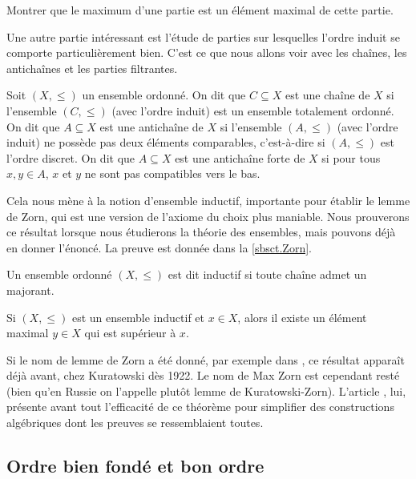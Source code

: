 \begin{exercise}
  Montrer que le maximum d'une partie est un élément maximal de cette partie.
\end{exercise}

Une autre partie intéressant est l'étude de parties sur lesquelles l'ordre
induit se comporte particulièrement bien. C'est ce que nous allons voir avec les
chaînes, les antichaînes et les parties filtrantes.

\begin{definition}
  Soit $(X,\leq)$ un ensemble ordonné. On dit que $C\subseteq X$ est une chaîne
  de $X$ si l'ensemble $(C,\leq)$ (avec l'ordre induit) est un ensemble
  totalement ordonné. On dit que $A\subseteq X$ est une antichaîne de $X$ si
  l'ensemble $(A,\leq)$ (avec l'ordre induit) ne possède pas deux éléments
  comparables, c'est-à-dire si $(A,\leq)$ est l'ordre discret. On dit que
  $A\subseteq X$ est une antichaîne forte de $X$ si pour tous $x,y\in A$, $x$ et
  $y$ ne sont pas compatibles vers le bas.
\end{definition}

Cela nous mène à la notion d'ensemble inductif, importante pour établir le lemme
de Zorn, qui est une version de l'axiome du choix plus maniable. Nous prouverons
ce résultat lorsque nous étudierons la théorie des ensembles, mais pouvons déjà
en donner l'énoncé. La preuve est donnée dans la \cref{sbsct.Zorn}.

\begin{definition}
  Un ensemble ordonné $(X,\leq)$ est dit inductif si toute chaîne admet un
  majorant.
\end{definition}

\begin{theorem}\label{thm.Zorn}
  Si $(X,\leq)$ est un ensemble inductif et $x\in X$, alors il existe un élément
  maximal $y \in X$ qui est supérieur à $x$.
\end{theorem}

Si le nom de lemme de Zorn a été donné, par exemple dans \cite{Tukey}, ce
résultat apparaît déjà avant, chez Kuratowski dès 1922. Le nom de Max Zorn est
cependant resté (bien qu'en Russie on l'appelle plutôt lemme de Kuratowski-Zorn).
L'article \cite{ZornLemma}, lui, présente avant tout l'efficacité de ce
théorème pour simplifier des constructions algébriques dont les preuves se
ressemblaient toutes.

\subsection{Ordre bien fondé et bon ordre}


